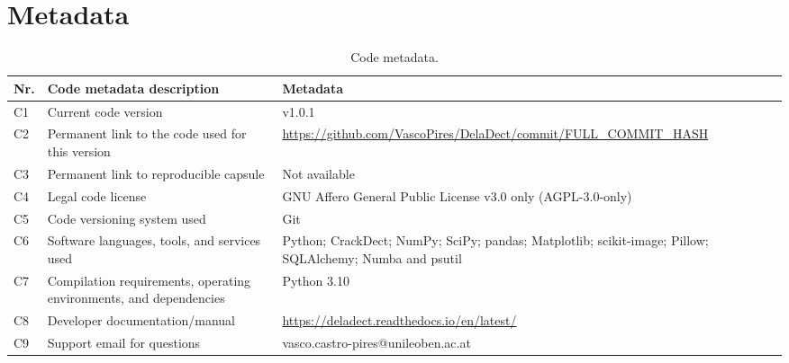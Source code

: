 \documentclass[final,5p,times]{elsarticle}
\begin{document}
	
	\section*{Metadata}
	\label{sec:metadata}
	
	\begin{table}[t]
		\centering
		\begin{tabular}{|l|p{6.5cm}|p{6.5cm}|}
			\hline
			\textbf{Nr.} & \textbf{Code metadata description} & \textbf{Metadata} \\
			\hline
			C1 & Current code version & v1.0.1 \\
			\hline
			C2 & Permanent link to the code used for this version &
			\url{https://github.com/VascoPires/DelaDect/commit/FULL_COMMIT_HASH} \\
			\hline
			C3 & Permanent link to reproducible capsule & Not available \\
			\hline
			C4 & Legal code license &
			GNU Affero General Public License v3.0 only (AGPL-3.0-only) \\
			\hline
			C5 & Code versioning system used & Git \\
			\hline
			C6 & Software languages, tools, and services used &
			Python; CrackDect; NumPy; SciPy; pandas; Matplotlib; scikit-image;
			Pillow; SQLAlchemy; Numba and psutil \\
			\hline
			C7 & Compilation requirements, operating environments, and dependencies &
			Python 3.10 \\
			\hline
			C8 & Developer documentation/manual &
			\url{https://deladect.readthedocs.io/en/latest/} \\
			\hline
			C9 & Support email for questions &
			vasco.castro-pires@unileoben.ac.at \\
			\hline
		\end{tabular}
		\caption{Code metadata.}
		\label{tab:code-metadata}
	\end{table}
	
\end{document}
